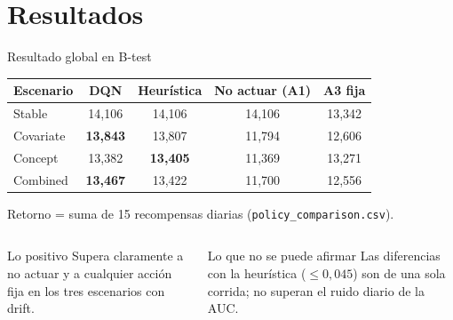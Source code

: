 \documentclass[aspectratio=169,10pt,xcolor=table]{beamer}
\begin{document}
\section{Resultados}
\begin{frame}{Resultado global en B-test}
\centering
\begin{tabular}{@{}lcccc@{}}
\toprule
Escenario & DQN & Heurística & No actuar (A1) & A3 fija \\
\midrule
Stable    & 14,106 & 14,106 & 14,106 & 13,342 \\
Covariate & \textbf{13,843} & 13,807 & 11,794 & 12,606 \\
Concept   & 13,382 & \textbf{13,405} & 11,369 & 13,271 \\
Combined  & \textbf{13,467} & 13,422 & 11,700 & 12,556 \\
\bottomrule
\end{tabular}

\vspace{0.3em}
\footnotesize Retorno = suma de 15 recompensas diarias (\texttt{policy\_comparison.csv}).
\normalsize
\vspace{0.8em}
\begin{columns}[T]
\begin{block}{Lo positivo}
Supera claramente a no actuar y a cualquier acción fija en los tres escenarios con drift.
\end{block}
\begin{alertblock}{Lo que no se puede afirmar}
Las diferencias con la heurística ($\leq 0{,}045$) son de una sola corrida; no
superan el ruido diario de la AUC.
\end{alertblock}
\end{columns}
\end{frame}

\end{document}
